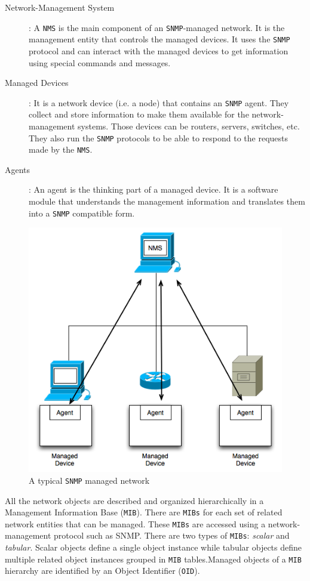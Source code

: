 \begin{description}
	\item [Network-Management System]: A \texttt{NMS} is the main component of an \texttt{SNMP}-managed network. It is the management entity that controls the managed devices. It uses the \texttt{SNMP} protocol and can interact with the managed devices to get information using special commands and messages.
	
	\item [Managed Devices]: It is a network device (i.e. a node) that contains an \texttt{SNMP} agent. They collect and store information to make them available for the network-management systems. Those devices can be routers, servers, switches, etc. They also run the \texttt{SNMP} protocols to be able to respond to the requests made by the \texttt{NMS}.
	
	\item [Agents]: An agent is the thinking part of a managed device. It is a software module that understands the management information and translates them into a \texttt{SNMP} compatible form.
\end{description}

\begin{figure}[H]
\centering
	\includegraphics[width=.5\linewidth]{Pictures/chapter2/snmp.png}
	\caption{A typical \texttt{SNMP} managed network}
\end{figure}

All the network objects are described and organized hierarchically in a Management Information Base (\texttt{MIB}). There are \texttt{MIBs} for each set of related network entities that can be managed. These \texttt{MIBs} are accessed using a network-management protocol such as SNMP. There are two types of \texttt{MIBs}: \textit{scalar} and \textit{tabular}. Scalar objects define a single object instance while tabular objects define multiple related object instances grouped in \texttt{MIB} tables.Managed objects of a \texttt{MIB} hierarchy are identified by an Object Identifier (\texttt{OID}).



